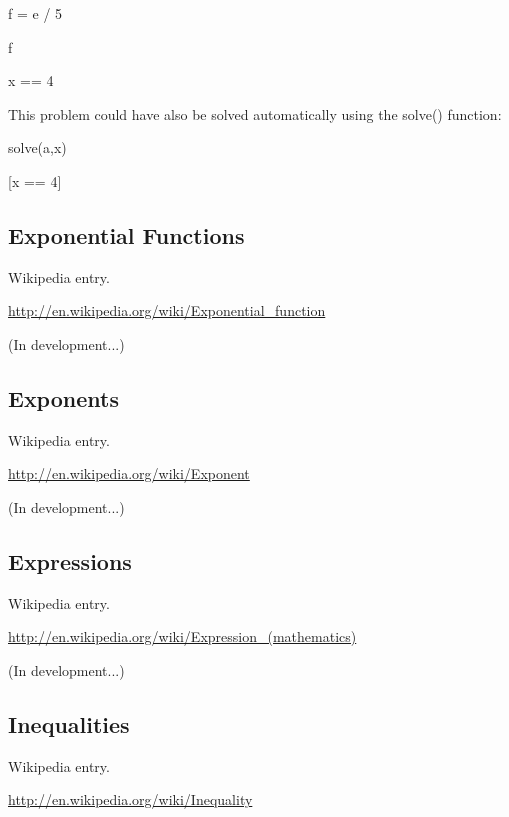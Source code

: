 \documentclass[12pt,oneside]{book}
\begin{document}
{\textquotedbl}{\textquotedbl}{\textquotedbl}

f = e / 5

f

{\textbar}

x == 4


{\textquotedbl}{\textquotedbl}{\textquotedbl}

This problem could have also be solved automatically using the solve() function:

{\textquotedbl}{\textquotedbl}{\textquotedbl}

solve(a,x)

{\textbar}

[x == 4]
\subsection[Exponential Functions]{Exponential Functions}

Wikipedia entry.

\href{http://en.wikipedia.org/wiki/Exponential_function}{http://en.wikipedia.org/wiki/Exponential\_function}

(In development...)

\subsection[Exponents]{Exponents}

Wikipedia entry.

\href{http://en.wikipedia.org/wiki/Exponent}{http://en.wikipedia.org/wiki/Exponent}

(In development...)

\subsection[Expressions]{Expressions}

Wikipedia entry.

\href{http://en.wikipedia.org/wiki/Expression_(mathematics)}{http://en.wikipedia.org/wiki/Expression\_(mathematics)}

(In development...)

\subsection[Inequalities]{Inequalities}

Wikipedia entry.

\href{http://en.wikipedia.org/wiki/Inequality}{http://en.wikipedia.org/wiki/Inequality}
\end{document}

